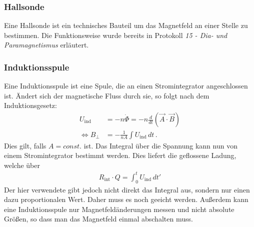 \documentclass[12pt,a4paper,titlepage,headinclude,bibtotoc]{scrartcl}
\begin{document}
\subsubsection*{Hallsonde}
Eine Hallsonde ist ein technisches Bauteil um das Magnetfeld an einer Stelle zu bestimmen.
Die Funktionsweise wurde bereits in Protokoll \emph{15 - Dia- und Paramagnetismus} erläutert.

\subsubsection*{Induktionsspule}
Eine Induktionsspule ist eine Spule, die an einen Stromintegrator angeschlossen ist.
Ändert sich der magnetische Fluss durch sie, so folgt nach dem Induktionsgesetz:
\begin{align}
	U_\text{ind}&=-n\dot\Phi=-n\frac d{dt}(\vec A\cdot\vec B)\\
	\Leftrightarrow B_\perp &=-\frac{1}{nA}\int U_\text{ind}\, dt\,.
\end{align}
Dies gilt, falls $A=const.$ ist.
Das Integral über die Spannung kann nun von einem Stromintegrator bestimmt werden.
Dies liefert die geflossene Ladung, welche über 
\begin{align}
	R_\text{int}\cdot Q=\int_0^t U_\text{ind}\, dt'
\end{align}
Der hier verwendete gibt jedoch nicht direkt das Integral aus, sondern nur einen dazu proportionalen Wert.
Daher muss es noch geeicht werden.
Außerdem kann eine Induktionsspule nur Magnetfeldänderungen messen und nicht absolute Größen, so dass man das Magnetfeld einmal abschalten muss.
\end{document}
